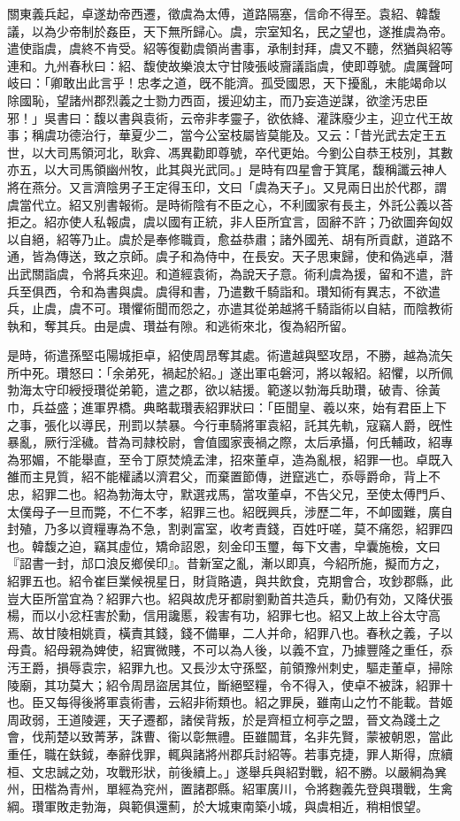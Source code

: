 \begin{pinyinscope}
關東義兵起，卓遂劫帝西遷，徵虞為太傅，道路隔塞，信命不得至。袁紹、韓馥議，以為少帝制於姦臣，天下無所歸心。虞，宗室知名，民之望也，遂推虞為帝。遣使詣虞，虞終不肯受。紹等復勸虞領尚書事，承制封拜，虞又不聽，然猶與紹等連和。九州春秋曰：紹、馥使故樂浪太守甘陵張岐齎議詣虞，使即尊號。虞厲聲呵岐曰：「卿敢出此言乎！忠孝之道，旣不能濟。孤受國恩，天下擾亂，未能竭命以除國恥，望諸州郡烈義之士勠力西靣，援迎幼主，而乃妄造逆謀，欲塗汚忠臣邪！」吳書曰：馥以書與袁術，云帝非孝靈子，欲依絳、灌誅廢少主，迎立代王故事；稱虞功德治行，華夏少二，當今公室枝屬皆莫能及。又云：「昔光武去定王五世，以大司馬領河北，耿弇、馮異勸即尊號，卒代更始。今劉公自恭王枝別，其數亦五，以大司馬領幽州牧，此其與光武同。」是時有四星會于箕尾，馥稱讖云神人將在燕分。又言濟陰男子王定得玉印，文曰「虞為天子」。又見兩日出於代郡，謂虞當代立。紹又別書報術。是時術陰有不臣之心，不利國家有長主，外託公義以荅拒之。紹亦使人私報虞，虞以國有正統，非人臣所宜言，固辭不許；乃欲圖奔匈奴以自絕，紹等乃止。虞於是奉修職貢，愈益恭肅；諸外國羌、胡有所貢獻，道路不通，皆為傳送，致之京師。虞子和為侍中，在長安。天子思東歸，使和偽逃卓，潛出武關詣虞，令將兵來迎。和道經袁術，為說天子意。術利虞為援，留和不遣，許兵至俱西，令和為書與虞。虞得和書，乃遣數千騎詣和。瓚知術有異志，不欲遣兵，止虞，虞不可。瓚懼術聞而怨之，亦遣其從弟越將千騎詣術以自結，而陰教術執和，奪其兵。由是虞、瓚益有隙。和逃術來北，復為紹所留。

是時，術遣孫堅屯陽城拒卓，紹使周昂奪其處。術遣越與堅攻昂，不勝，越為流矢所中死。瓚怒曰：「余弟死，禍起於紹。」遂出軍屯磐河，將以報紹。紹懼，以所佩勃海太守印綬授瓚從弟範，遣之郡，欲以結援。範遂以勃海兵助瓚，破青、徐黃巾，兵益盛；進軍界橋。典略載瓚表紹罪狀曰：「臣聞皇、羲以來，始有君臣上下之事，張化以導民，刑罰以禁暴。今行車騎將軍袁紹，託其先軌，寇竊人爵，旣性暴亂，厥行淫穢。昔為司隷校尉，會值國家喪禍之際，太后承攝，何氏輔政，紹專為邪媚，不能舉直，至令丁原焚燒孟津，招來董卓，造為亂根，紹罪一也。卓既入雒而主見質，紹不能權譎以濟君父，而棄置節傳，迸竄逃亡，忝辱爵命，背上不忠，紹罪二也。紹為勃海太守，默選戎馬，當攻董卓，不告父兄，至使太傅門戶、太僕母子一旦而斃，不仁不孝，紹罪三也。紹旣興兵，涉歷二年，不卹國難，廣自封殖，乃多以資糧專為不急，割剥富室，收考責錢，百姓吁嗟，莫不痛怨，紹罪四也。韓馥之迫，竊其虛位，矯命詔恩，刻金印玉璽，每下文書，皁囊施檢，文曰『詔書一封，邟口浪反鄉侯印』。昔新室之亂，漸以即真，今紹所施，擬而方之，紹罪五也。紹令崔巨業候視星日，財貨賂遺，與共飲食，克期會合，攻鈔郡縣，此豈大臣所當宜為？紹罪六也。紹與故虎牙都尉劉勳首共造兵，勳仍有効，又降伏張楊，而以小忿枉害於勳，信用讒慝，殺害有功，紹罪七也。紹又上故上谷太守高焉、故甘陵相姚貢，橫責其錢，錢不備畢，二人并命，紹罪八也。春秋之義，子以母貴。紹母親為婢使，紹實微賤，不可以為人後，以義不宜，乃據豐隆之重任，忝汚王爵，損辱袁宗，紹罪九也。又長沙太守孫堅，前領豫州刺史，驅走董卓，掃除陵廟，其功莫大；紹令周昂盜居其位，斷絕堅糧，令不得入，使卓不被誅，紹罪十也。臣又每得後將軍袁術書，云紹非術類也。紹之罪戾，雖南山之竹不能載。昔姬周政弱，王道陵遲，天子遷都，諸侯背叛，於是齊桓立柯亭之盟，晉文為踐土之會，伐荊楚以致菁茅，誅曹、衞以彰無禮。臣雖闒茸，名非先賢，蒙被朝恩，當此重任，職在鈇鉞，奉辭伐罪，輒與諸將州郡兵討紹等。若事克捷，罪人斯得，庶續桓、文忠誠之効，攻戰形狀，前後續上。」遂舉兵與紹對戰，紹不勝。以嚴綱為兾州，田楷為青州，單經為兖州，置諸郡縣。紹軍廣川，令將麴義先登與瓚戰，生禽綱。瓚軍敗走勃海，與範俱還薊，於大城東南築小城，與虞相近，稍相恨望。


\end{pinyinscope}
